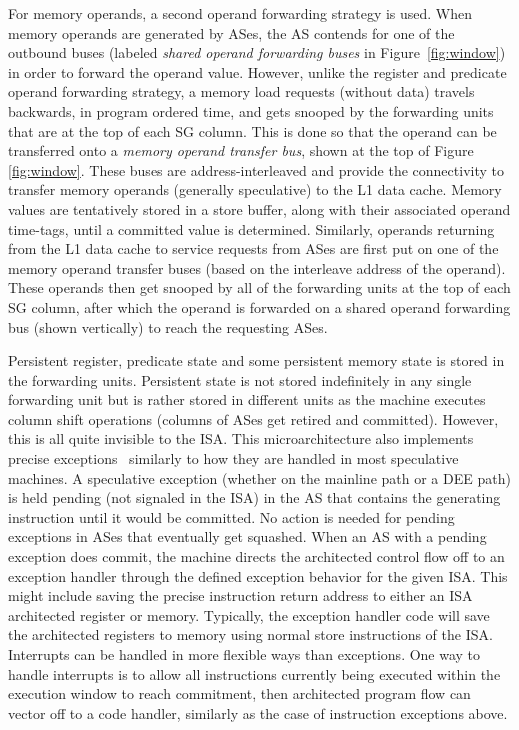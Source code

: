\documentclass{book}
\begin{document}
For memory operands, a second operand forwarding strategy is used.
When memory operands are generated by ASes, the AS contends
for one of the outbound buses 
(labeled {\em shared operand forwarding buses} in Figure~\ref{fig:window}) 
in order to forward the operand value.
However, unlike the register and predicate operand forwarding
strategy, a memory load requests (without data)
travels backwards, in program ordered
time, and gets snooped by the forwarding units that are at the top
of each SG column.  This is done so that the operand can
be transferred onto a {\em memory operand transfer bus}, shown
at the top of Figure \ref{fig:window}.  
These buses are address-interleaved and
provide the connectivity to transfer memory operands (generally
speculative) to the L1 data cache.
Memory values are tentatively stored in a store buffer, along with 
their associated operand
time-tags, until a committed value is determined.
Similarly, operands returning from the L1 data cache to service requests
from ASes are first put on one of the memory operand transfer buses (based
on the interleave address of the operand).  These operands then get snooped
by all of the forwarding units at the top of each SG
column, after which the operand is forwarded on a shared operand
forwarding bus (shown vertically) to reach the requesting ASes.

Persistent register, predicate state and some persistent
memory state is stored in the forwarding units.
Persistent state is not stored indefinitely in any single forwarding
unit but is rather stored in different units as the machine
executes column shift operations (columns of ASes get retired
and committed).  However, this is all quite invisible to the ISA.
This microarchitecture also implements precise exceptions~\cite{Smi88}
similarly to how they
are handled in most speculative machines.  
A speculative exception (whether on the mainline path or a DEE path)
is held pending (not signaled in the ISA)
in the AS that contains the generating
instruction until it would be committed.
No action is needed for pending exceptions in ASes that eventually
get squashed.
When an AS with a pending exception does commit, the machine directs the
architected control flow off to an exception handler through
the defined exception behavior for the given ISA.
This might include saving the precise instruction return
address to either an ISA architected register or memory.
Typically, the exception handler code will save the architected
registers to memory using normal
store instructions of the ISA.
Interrupts can be handled in more flexible ways than exceptions.
One way to handle interrupts is to allow all instructions
currently being executed within the execution window to reach
commitment, then architected program flow can vector off to
a code handler, similarly as the case of instruction exceptions above.
%
%
%
%
%
\end{document}
